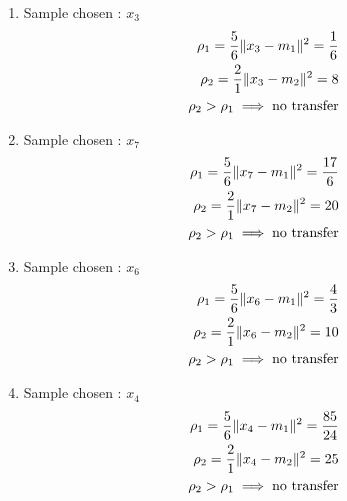 \documentclass[a4paper, 10pt, twoside]{article}
\begin{document}
\begin{enumerate}[a)]
\begin{enumerate}[1.]
		      \item Sample chosen : $x_3$
		            \begin{align*}
			            \rho_1 = \frac{5}{6}\Vert x_3-m_1 \Vert^2 = \frac{1}{6} \\
			            \rho_2 = \frac{2}{1}\Vert x_3-m_2 \Vert^2 = 8           \\
			            \rho_2 > \rho_1 \implies \text{no transfer}        \\
		            \end{align*}

		      \item Sample chosen : $x_7$
		            \begin{align*}
			            \rho_1 = \frac{5}{6}\Vert x_7-m_1 \Vert^2 = \frac{17}{6} \\
			            \rho_2 = \frac{2}{1}\Vert x_7-m_2 \Vert^2 = 20           \\
			            \rho_2 > \rho_1 \implies \text{no transfer}         \\
		            \end{align*}

		      \item Sample chosen : $x_6$
		            \begin{align*}
			            \rho_1 = \frac{5}{6}\Vert x_6-m_1 \Vert^2 = \frac{4}{3} \\
			            \rho_2 = \frac{2}{1}\Vert x_6-m_2 \Vert^2 = 10          \\
			            \rho_2 > \rho_1 \implies \text{no transfer}        \\
		            \end{align*}

		      \item Sample chosen : $x_4$
		            \begin{align*}
			            \rho_1 = \frac{5}{6}\Vert x_4-m_1 \Vert^2 = \frac{85}{24} \\
			            \rho_2 = \frac{2}{1}\Vert x_4-m_2 \Vert^2 = 25            \\
			            \rho_2 > \rho_1 \implies \text{no transfer}          \\
		            \end{align*}


\end{enumerate}
\end{enumerate}
\end{document}
